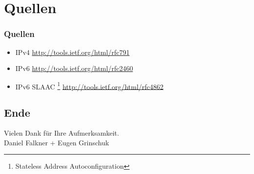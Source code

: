 \documentclass[xcolor=dvipsnames]{beamer}
\newcommand*{\Author}{Daniel Falkner + Eugen Grinschuk} %
\begin{document}
\section{Quellen}
\begin{frame}
 \frametitle{Quellen}
  \begin{block}{}
	  \begin{itemize}
  		\item IPv4 \url{http://tools.ietf.org/html/rfc791}
  		\item IPv6 \url{http://tools.ietf.org/html/rfc2460}
  		\item IPv6 SLAAC \footnote{Stateless Address Autoconfiguration} \url{http://tools.ietf.org/html/rfc4862}
	  \end{itemize}
  \end{block}
\end{frame}

\subsection*{Ende}
\begin{frame}
	\begin{block}{}	
		\begin{center}
			Vielen Dank für Ihre Aufmerksamkeit. \\
			\Author{}
		\end{center}	
	\end{block}
\end{frame}
\end{document}

